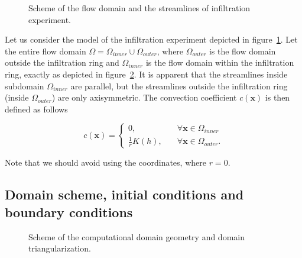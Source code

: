 \documentclass[review,times,3p,twocolumn,10pt]{elsarticle}
\newenvironment{lineq}
    {\begin{linenomath*}
    \begin{equation}
    }
    { 
    \end{equation} 
    \end{linenomath*}
    }
\renewcommand{\vec}{\mathbf}
\begin{document}
 \begin{figure}
\centering
{}
 \caption{Scheme of the flow domain and the streamlines of infiltration experiment. }
 \label{valecproudy}
\end{figure}

Let us consider the model of the infiltration experiment depicted in figure~\ref{valecproudy}. Let the entire flow domain $\Omega=\Omega_{inner} \cup \Omega_{outer}$, where $\Omega_{outer}$ is the flow domain outside the infiltration ring and $\Omega_{inner}$ is the flow domain within the infiltration ring, exactly as depicted in figure~\ref{valec}. It is apparent that the streamlines inside subdomain $\Omega_{inner}$ are parallel, but the streamlines outside the infiltration ring (inside $\Omega_{outer}$) are only axisymmetric. The convection coefficient $c(\vec{x})$ is then defined as follows
\begin{lineq}
\label{convect}
c(\vec{x}) = \begin{cases}
	     0 , \quad &\forall \vec{x} \in \Omega_{inner} \\
	     \frac{1}{r}K(h) , \quad &\forall \vec{x} \in \Omega_{outer}.
	    \end{cases}
\end{lineq}
Note that we should avoid using the coordinates, where $r=0$.


\subsection{Domain scheme, initial conditions and boundary conditions}%
\label{bccond}
 \begin{figure}
\centering
{}
 \caption{Scheme of the computational domain geometry and domain triangularization.}
 \label{valec}
\end{figure}
\end{document}
